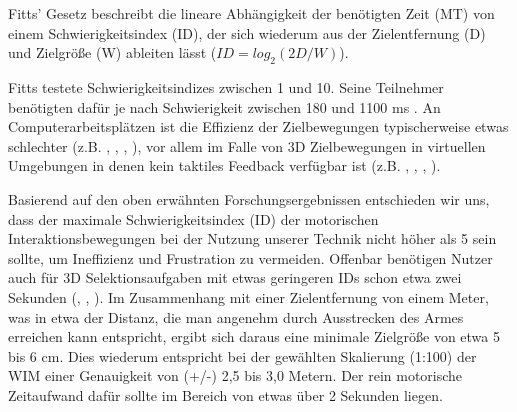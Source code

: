 Fitts' Gesetz beschreibt die lineare Abhängigkeit der benötigten Zeit (MT) von einem
Schwierigkeitsindex (ID), der sich wiederum aus der Zielentfernung (D) und Zielgröße (W) ableiten lässt ($ID=log_2(2D/W)$).

Fitts testete Schwierigkeitsindizes zwischen 1 und 10. Seine Teilnehmer benötigten dafür je nach Schwierigkeit zwischen 180 und 1100 ms \cite{fitts1954information}. An Computerarbeitsplätzen ist die Effizienz der Zielbewegungen typischerweise etwas schlechter (z.B. \cite{Forlines}, \cite{mackenzie1992fitts}, \cite{MacKenzie:2008:FTS:1357054.1357308}, \cite{Wobbrock:2008:EMP:1357054.1357306}), vor 
allem im Falle von 3D Zielbewegungen in virtuellen Umgebungen in denen kein taktiles Feedback verfügbar ist (z.B. \cite{arsenault2004importance}, \cite{grossman2004pointing}, \cite{teather2011pointing}, \cite{lubos2014analysis}).

Basierend auf den oben erwähnten Forschungsergebnissen entschieden wir
uns, dass der maximale Schwierigkeitsindex (ID) der motorischen
Interaktionsbewegungen bei der Nutzung unserer Technik nicht höher als 5 sein sollte, um Ineffizienz und Frustration zu vermeiden. Offenbar benötigen Nutzer auch für 3D Selektionsaufgaben mit etwas geringeren IDs schon etwa zwei Sekunden (\cite{grossman2004pointing}, \cite{teather2011pointing}, \cite{lubos2014analysis}). Im
Zusammenhang mit einer Zielentfernung von einem Meter, was in etwa der Distanz, die man angenehm durch Ausstrecken des Armes erreichen kann entspricht, ergibt sich daraus eine minimale Zielgröße von etwa 5 bis 6 cm. Dies wiederum entspricht bei der gewählten Skalierung (1:100) der WIM einer Genauigkeit von (+/-) 2,5 bis 3,0 Metern. Der rein motorische Zeitaufwand dafür sollte im Bereich von etwas über 2 Sekunden liegen.



